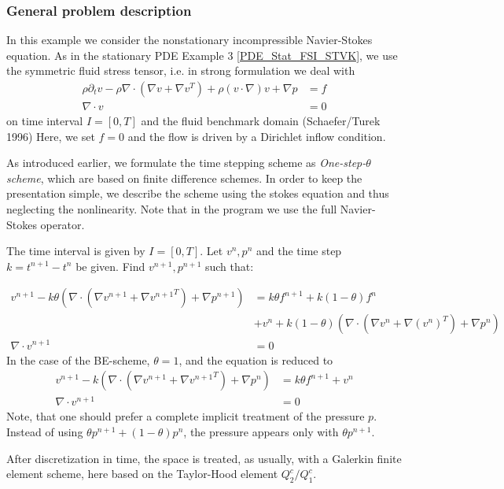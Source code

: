 \subsubsection{General problem description}
In this example we consider the nonstationary incompressible Navier-Stokes equation. As in the stationary PDE Example 3 \ref{PDE_Stat_FSI_STVK},
we use the symmetric fluid stress tensor, i.e. 
in strong formulation we deal with 
\begin{align*}
\rho \partial_t v - \rho \nabla\cdot (\nabla v + \nabla v^{T}) + \rho (v\cdot\nabla)v  +\nabla p &= f \\
\nabla\cdot v &= 0 
\end{align*}
on time interval $I=[0,T]$ and the fluid benchmark domain (Schaefer/Turek 1996) 
Here, we set $f=0$ and the flow is driven by a Dirichlet inflow condition.


As introduced earlier, we formulate the time stepping scheme as \textit{One-step-$\theta$ scheme},
which are based on finite difference schemes. In order to keep the presentation simple, we describe the scheme using the stokes equation and thus neglecting the nonlinearity. Note that in the program we use the full Navier-Stokes operator.

The time interval is given by $I=[0,T]$. Let $v^n,p^n$ and the time
step $k=t^{n+1}-t^n$ be given. Find $v^{n+1}, p^{n+1}$ such that:

\begin{align*}
v^{n+1} - k\theta \left(\nabla\cdot (\nabla v^{n+1} + \nabla {v^{n+1}}^T) + \nabla p^{n+1}\right) &=
k\theta f^{n+1} + k(1-\theta)f^{n}\\
&+  v^n + k(1-\theta) \left(\nabla\cdot (\nabla v^n + \nabla (v^n)^{T}) 
+ \nabla p^n\right) \\
\nabla \cdot v^{n+1} &= 0 
\end{align*}
In the case of the BE-scheme, $\theta = 1$, and the equation is reduced to
\begin{align*}
v^{n+1} - k (\nabla\cdot (\nabla v^{n+1} + \nabla {v^{n+1}}^{T}) + \nabla p^n) &=
k\theta f^{n+1} +  v^n  \\
\nabla \cdot v^{n+1} &= 0
\end{align*}
Note, that one should prefer a complete implicit treatment of the
pressure $p$. Instead of using $\theta p^{n+1} + (1-\theta)p^n$, the pressure
appears only with $\theta p^{n+1}$.

After discretization in time, the space is treated, as usually, with 
a Galerkin finite element scheme, here based on the Taylor-Hood element 
$Q_2^c / Q_1^c$.

